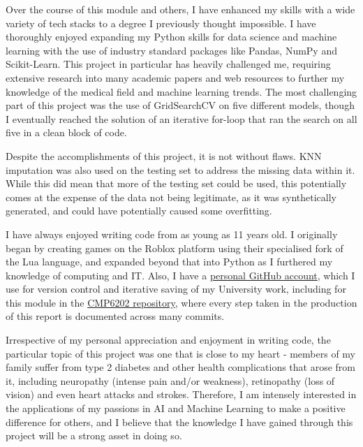 \documentclass[12pt]{report}
\newcommand{\para}{\vspace{8pt}\noindent}
\begin{document}
Over the course of this module and others, I have enhanced my skills with a wide variety of tech stacks to a degree 
I previously thought impossible. I have thoroughly enjoyed expanding my Python skills for data science and machine learning 
with the use of industry standard packages like Pandas, NumPy and Scikit-Learn. This project in particular has heavily challenged me, 
requiring extensive research into many academic papers and web resources to further my knowledge of the medical field 
and machine learning trends. The most challenging part of this project was the use of GridSearchCV on five different models, though 
I eventually reached the solution of an iterative for-loop that ran the search on all five in a clean block of code.

\para Despite the accomplishments of this project, it is not without flaws. KNN imputation was also used on the testing set to address 
the missing data within it. While this did mean that more of the testing set could be used, this potentially comes at the expense of 
the data not being legitimate, as it was synthetically generated, and could have potentially caused some overfitting.

\para I have always enjoyed writing code from as young as 11 years old. I originally began by creating games on the Roblox platform 
using their specialised fork of the Lua language, and expanded beyond that into Python as I furthered my knowledge of computing 
and IT. Also, I have a \href{https://github.com/LewGoesB00M}{personal GitHub account}, which I use for version control and iterative 
saving of my University work, including for this module in the \href{https://github.com/LewGoesB00M/CMP6202}{CMP6202 repository}, 
where every step taken in the production of this report is documented across many commits.

\para Irrespective of my personal appreciation and enjoyment in writing code, the particular topic of this project was one 
that is close to my heart - members of my family suffer from type 2 diabetes and other health complications that arose from it,
including neuropathy (intense pain and/or weakness), retinopathy (loss of vision) and even heart attacks and strokes. 
Therefore, I am intensely interested in the applications of my passions in AI and Machine Learning to make a positive difference 
for others, and I believe that the knowledge I have gained through this project will be a strong asset in doing so.







\printbibliography
\end{document}
